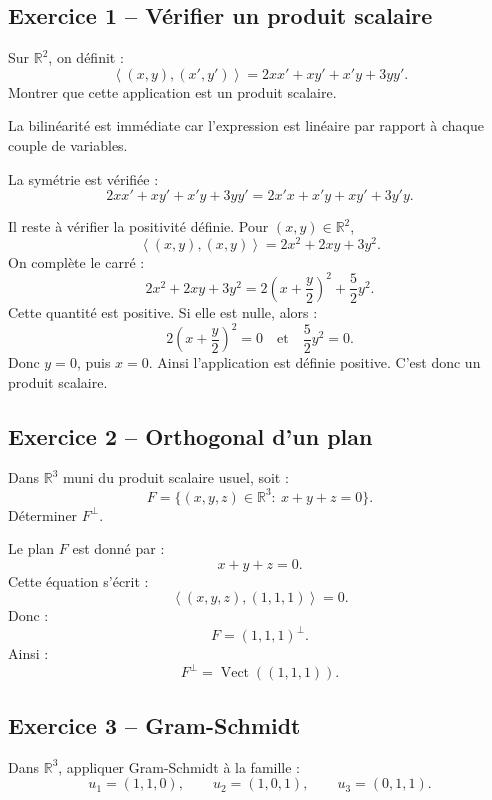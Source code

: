 \documentclass[11pt,a4paper]{article}
\newcommand{\R}{\mathbb R}
\newcommand{\Vect}{\operatorname{Vect}}
\newcommand{\scal}[2]{\left\langle #1,#2\right\rangle}
\begin{document}
\subsection*{Exercice 1 -- Vérifier un produit scalaire}

\begin{exercicebox}
Sur \(\R^2\), on définit :
\[
\scal{(x,y)}{(x',y')}=2xx'+xy'+x'y+3yy'.
\]
Montrer que cette application est un produit scalaire.
\end{exercicebox}

\begin{correctionbox}
La bilinéarité est immédiate car l'expression est linéaire par rapport à chaque couple de variables.

La symétrie est vérifiée :
\[
2xx'+xy'+x'y+3yy'
=
2x'x+x'y+xy'+3y'y.
\]

Il reste à vérifier la positivité définie.  
Pour \((x,y)\in\R^2\),
\[
\scal{(x,y)}{(x,y)}
=
2x^2+2xy+3y^2.
\]
On complète le carré :
\[
2x^2+2xy+3y^2
=
2\left(x+\frac y2\right)^2+\frac52y^2.
\]
Cette quantité est positive.  
Si elle est nulle, alors :
\[
2\left(x+\frac y2\right)^2=0
\quad\text{et}\quad
\frac52y^2=0.
\]
Donc \(y=0\), puis \(x=0\).  
Ainsi l'application est définie positive.  
C'est donc un produit scalaire.
\end{correctionbox}

\subsection*{Exercice 2 -- Orthogonal d'un plan}

\begin{exercicebox}
Dans \(\R^3\) muni du produit scalaire usuel, soit :
\[
F=\{(x,y,z)\in\R^3:\ x+y+z=0\}.
\]
Déterminer \(F^\perp\).
\end{exercicebox}

\begin{correctionbox}
Le plan \(F\) est donné par :
\[
x+y+z=0.
\]
Cette équation s'écrit :
\[
\scal{(x,y,z)}{(1,1,1)}=0.
\]
Donc :
\[
F=(1,1,1)^\perp.
\]
Ainsi :
\[
F^\perp=\Vect((1,1,1)).
\]
\end{correctionbox}

\subsection*{Exercice 3 -- Gram-Schmidt}

\begin{exercicebox}
Dans \(\R^3\), appliquer Gram-Schmidt à la famille :
\[
u_1=(1,1,0),\qquad u_2=(1,0,1),\qquad u_3=(0,1,1).
\]
\end{exercicebox}
\end{document}
